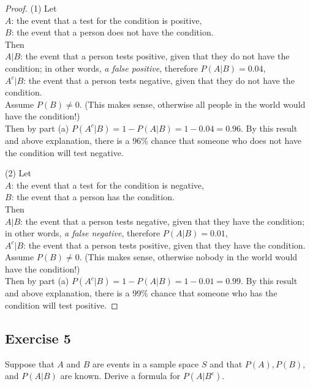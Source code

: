 \documentclass[14pt]{extarticle}
\begin{document}
\begin{proof}
(1) Let \\
\(A\): the event that a test for the condition is positive, \\ \(B\): the event that a person does not have the condition. \\
Then \\
\(A|B\): the event that a person tests positive, given that they do not have the condition; in other words, {\it a false 
positive}, therefore \(P(A|B) = 0.04\), \\
\(A^c|B\): the event that a person tests negative, given that they do not have the condition. \\
Assume \(P(B) \neq 0\). (This makes sense, otherwise all people in the world would have the condition!) \\
Then by part (a) \(P(A^c | B) = 1 - P(A|B) = 1-0.04 = 0.96\). By this result and above explanation, there is a 96\% chance
that someone who does not have the condition will test negative.

(2) Let \\
\(A\): the event that a test for the condition is negative, \\ \(B\): the event that a person has the condition. \\
Then \\
\(A|B\): the event that a person tests negative, given that they have the condition; in other words, {\it a false 
negative}, therefore \(P(A|B) = 0.01\), \\
\(A^c|B\): the event that a person tests positive, given that they have the condition. \\
Assume \(P(B) \neq 0\). (This makes sense, otherwise nobody in the world would have the condition!) \\
Then by part (a) \(P(A^c | B) = 1 - P(A|B) = 1-0.01 = 0.99\). By this result and above explanation, there is a 99\% chance
that someone who has the condition will test positive.
\end{proof}

\subsection{Exercise 5}
Suppose that \(A\) and \(B\) are events in a sample space \(S\) and that \(P(A), P(B)\), and \(P(A | B)\) are known. 
Derive a formula for \(P(A | B^c)\).
\end{document}
